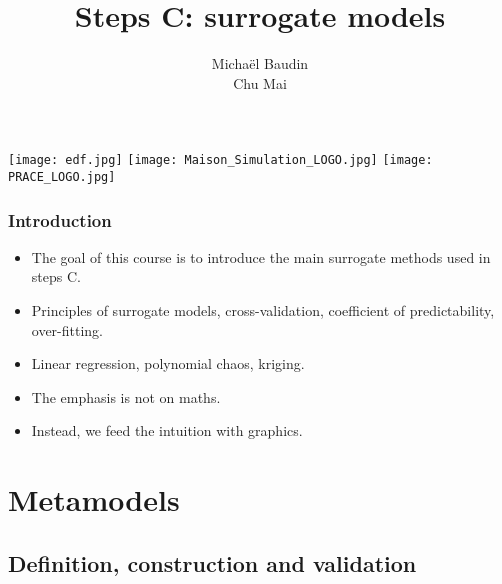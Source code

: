 \documentclass{beamer}
\title{Steps C: surrogate models}
\author[M. Baudin]{Michaël Baudin\\Chu Mai}
\begin{document}

\begin{frame}
\titlepage
  
\begin{center}
\texttt{[image: edf.jpg]}
\hspace{1cm}
\texttt{[image: Maison\_Simulation\_LOGO.jpg]}
\hspace{1cm}
\texttt{[image: PRACE\_LOGO.jpg]}
\end{center}

\end{frame}


\begin{frame}
\frametitle{Introduction}

\begin{itemize}
\item The goal of this course is to introduce the main surrogate methods used in 
steps C. 

\item Principles of surrogate models, cross-validation, coefficient of predictability, over-fitting.

\item Linear regression, polynomial chaos, kriging.

\item The emphasis is not on maths. 

\item Instead, we feed the intuition with graphics. 
\end{itemize}

\end{frame}


\begin{frame}
\begin{multicols}{2}
  {\tableofcontents[hideallsubsections]}
\end{multicols}
\end{frame}


\section{Metamodels}

\subsection{Definition, construction and validation}
\end{document}
